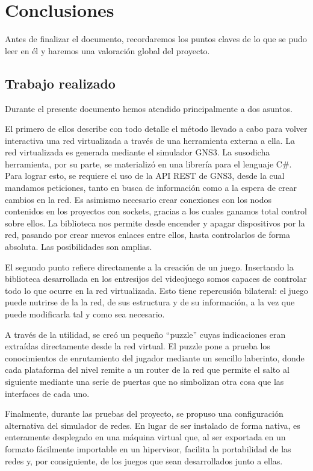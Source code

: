 \chapter{Conclusiones}\label{chap:Conclusiones}
Antes de finalizar el documento, recordaremos los puntos claves de lo que se pudo leer en él y haremos una valoración global del proyecto.

\section{Trabajo realizado}
Durante el presente documento hemos atendido principalmente a dos asuntos.

El primero de ellos describe con todo detalle el método llevado a cabo para volver interactiva una red virtualizada a través de una herramienta externa a ella. La red virtualizada es generada mediante el simulador GNS3. La susodicha herramienta, por su parte, se materializó en una librería para el lenguaje C\#. Para lograr esto, se requiere el uso de la API REST de GNS3, desde la cual mandamos peticiones, tanto en busca de información como a la espera de crear cambios en la red.  Es asimismo necesario crear conexiones con los nodos contenidos en los proyectos con sockets, gracias a los cuales ganamos total control sobre ellos. La biblioteca nos permite desde encender y apagar dispositivos por la red, pasando por crear nuevos enlaces entre ellos, hasta controlarlos de forma absoluta. Las posibilidades son amplias.

El segundo punto refiere directamente a la creación de un juego. Insertando la biblioteca desarrollada en los entresijos del videojuego somos capaces de controlar todo lo que ocurre en la red virtualizada. Esto tiene repercusión bilateral: el juego puede nutrirse de la la red, de sus estructura y de su información, a la vez que puede modificarla tal y como sea necesario.

A través de la utilidad, se creó un pequeño ``puzzle'' cuyas indicaciones eran extraídas directamente desde la red virtual. El puzzle pone a prueba los conocimientos de enrutamiento del jugador mediante un sencillo laberinto, donde cada plataforma del nivel remite a un router de la red que permite el salto al siguiente mediante una serie de puertas que no simbolizan otra cosa que las interfaces de cada uno.

Finalmente, durante las pruebas del proyecto, se propuso una configuración alternativa del simulador de redes. En lugar de ser instalado de forma nativa, es enteramente desplegado en una máquina virtual que, al ser exportada en un formato fácilmente importable en un hipervisor, facilita la portabilidad de las redes y, por consiguiente, de los juegos que sean desarrollados junto a ellas.

